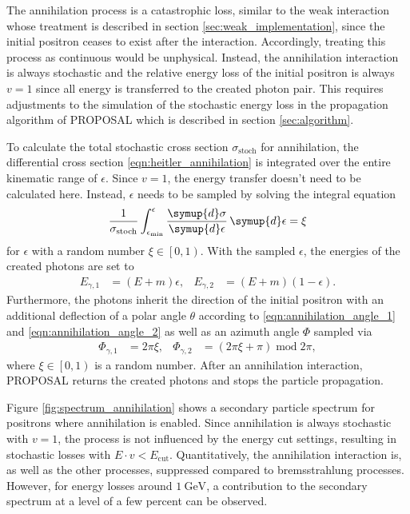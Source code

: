 The annihilation process is a catastrophic loss, similar to the weak interaction whose treatment is described in section \ref{sec:weak_implementation}, since the initial positron ceases to exist after the interaction.
Accordingly, treating this process as continuous would be unphysical.
Instead, the annihilation interaction is always stochastic and the relative energy loss of the initial positron is always $v=1$ since all energy is transferred to the created photon pair.
This requires adjustments to the simulation of the stochastic energy loss in the propagation algorithm of PROPOSAL which is described in section \ref{sec:algorithm}.

To calculate the total stochastic cross section $\sigma_{\text{stoch}}$ for annihilation, the differential cross section \eqref{eqn:heitler_annihilation} is integrated over the entire kinematic range of $\epsilon$.
Since $v=1$, the energy transfer doesn't need to be calculated here.
Instead, $\epsilon$ needs to be sampled by solving the integral equation
%
\begin{equation}
	\frac{1}{\sigma_{\text{stoch}}} \int_{\epsilon_{\text{min}}}^{\epsilon} \frac{\symup{d}\sigma}{\symup{d}\epsilon} \, \symup{d}\epsilon = \xi
\end{equation}
%
for $\epsilon$ with a random number $\xi \in \left[0,1\right)$.
With the sampled $\epsilon$, the energies of the created photons are set to
%
\begin{align}
	E_{\gamma,1} &= (E + m) \epsilon, & E_{\gamma,2} &= (E + m) (1 - \epsilon).
\end{align}
%
Furthermore, the photons inherit the direction of the initial positron with an additional deflection of a polar angle $\theta$ according to \eqref{eqn:annihilation_angle_1} and \eqref{eqn:annihilation_angle_2} as well as an azimuth angle $\Phi$ sampled via
%
\begin{align}
	\Phi_{\gamma,1} &= 2 \pi \xi, & \Phi_{\gamma,2} &= (2 \pi \xi + \pi) \;\mathrm{mod}\; 2 \pi,
\end{align}
%
where $\xi \in \left[0,1\right)$ is a random number.
After an annihilation interaction, PROPOSAL returns the created photons and stops the particle propagation.

Figure \ref{fig:spectrum_annihilation} shows a secondary particle spectrum for positrons where annihilation is enabled.
Since annihilation is always stochastic with $v=1$, the process is not influenced by the energy cut settings, resulting in stochastic losses with $E \cdot v < {E_\text{cut}}$.
Quantitatively, the annihilation interaction is, as well as the other processes, suppressed compared to bremsstrahlung processes.
However, for energy losses around $\SI{1}{\giga\electronvolt}$, a contribution to the secondary spectrum at a level of a few percent can be observed.

